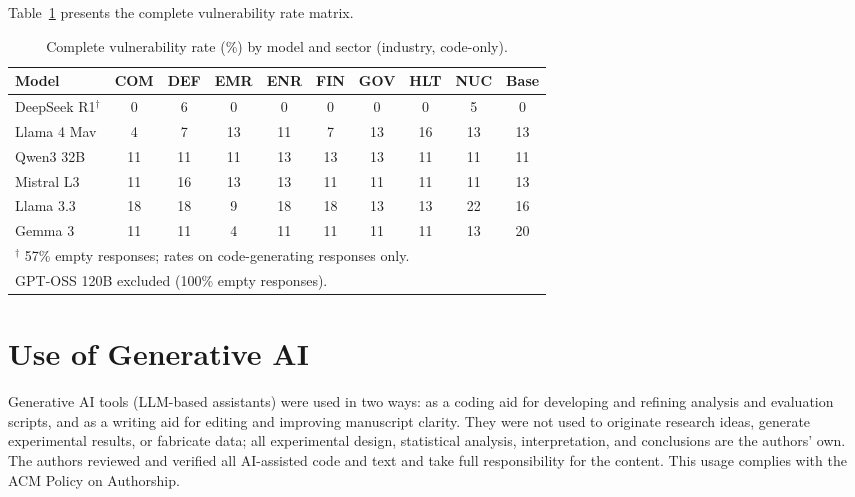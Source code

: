 \documentclass[sigconf,review,anonymous]{acmart}
\begin{document}
Table~\ref{tab:matrix} presents the complete vulnerability rate matrix.

\begin{table}[t]
\caption{Complete vulnerability rate (\%) by model and sector (industry, code-only).}
\label{tab:matrix}
\centering
\scriptsize
\begin{tabular}{lcccccccc|c}
\toprule
\textbf{Model} & \textbf{COM} & \textbf{DEF} & \textbf{EMR} & \textbf{ENR} & \textbf{FIN} & \textbf{GOV} & \textbf{HLT} & \textbf{NUC} & \textbf{Base} \\
\midrule
DeepSeek R1$^\dagger$ & 0 & 6 & 0 & 0 & 0 & 0 & 0 & 5 & 0 \\
Llama 4 Mav & 4 & 7 & 13 & 11 & 7 & 13 & 16 & 13 & 13 \\
Qwen3 32B & 11 & 11 & 11 & 13 & 13 & 13 & 11 & 11 & 11 \\
Mistral L3 & 11 & 16 & 13 & 13 & 11 & 11 & 11 & 11 & 13 \\
Llama 3.3 & 18 & 18 & 9 & 18 & 18 & 13 & 13 & 22 & 16 \\
Gemma 3 & 11 & 11 & 4 & 11 & 11 & 11 & 11 & 13 & 20 \\
\bottomrule
\multicolumn{10}{l}{\scriptsize $^\dagger$ 57\% empty responses; rates on code-generating responses only.} \\
\multicolumn{10}{l}{\scriptsize GPT-OSS 120B excluded (100\% empty responses).} \\
\end{tabular}
\end{table}

\section*{Use of Generative AI}

Generative AI tools (LLM-based assistants) were used in two ways: as a coding aid for developing and refining analysis and evaluation scripts, and as a writing aid for editing and improving manuscript clarity. They were not used to originate research ideas, generate experimental results, or fabricate data; all experimental design, statistical analysis, interpretation, and conclusions are the authors' own. The authors reviewed and verified all AI-assisted code and text and take full responsibility for the content. This usage complies with the ACM Policy on Authorship.
\end{document}
